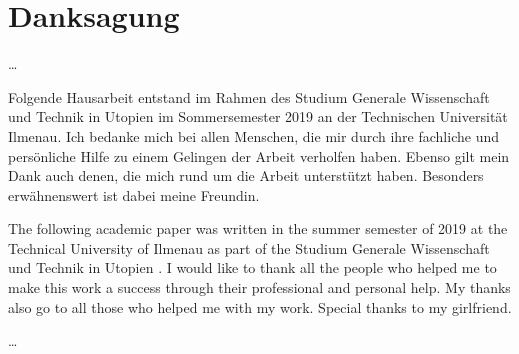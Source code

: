 %
%
%
%

\section*{Danksagung}
\ldots 
	
	Folgende Hausarbeit entstand im Rahmen des Studium Generale Wissenschaft und Technik in Utopien im Sommersemester 2019 an der Technischen Universität Ilmenau. Ich bedanke mich bei allen Menschen, die mir durch ihre fachliche und persönliche Hilfe zu einem Gelingen der Arbeit verholfen haben. Ebenso gilt mein Dank auch denen, die mich rund um die Arbeit unterstützt haben. Besonders erwähnenswert ist dabei meine Freundin.
	
	\vspace{10px}
	
	
	
	The following academic paper was written in the summer semester of 2019 at the Technical University of Ilmenau as part of the \dq Studium Generale Wissenschaft und Technik in Utopien \dq . I would like to thank all the people who helped me to make this work a success through their professional and personal help. My thanks also go to all those who helped me with my work. Special thanks to my girlfriend.
	
	
\ldots

